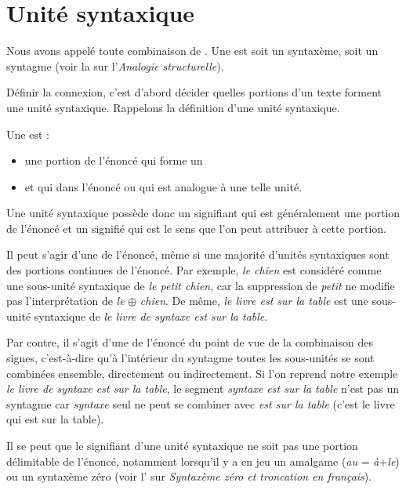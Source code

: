 \section{Unité syntaxique}\label{sec:3.2.9}

Nous avons appelé  toute combinaison de . Une  est soit un syntaxème, soit un syntagme (voir la  sur l'\textit{Analogie structurelle}).

Définir la connexion, c’est d’abord décider quelles portions d’un texte forment une unité syntaxique. Rappelons la définition d’une unité syntaxique.

{Une  est :

   \begin{itemize}
   \item une portion de l’énoncé qui forme un 
   \item et qui  dans l’énoncé ou qui est analogue à une telle unité.
   \end{itemize}
   }
   
Une unité syntaxique possède donc un signifiant qui est généralement une portion de l’énoncé et un signifié qui est le sens que l’on peut attribuer à cette portion.

Il peut s’agir d’une  de l’énoncé, même si une majorité d’unités syntaxiques sont des portions continues de l’énoncé. Par exemple, \textit{le chien} est considéré comme une sous-unité syntaxique de \textit{le petit chien}, car la suppression de \textit{petit} ne modifie pas l’interprétation de \textit{le} ${\oplus}$ \textit{chien}. De même, \textit{le livre est sur la table} est une sous-unité syntaxique de \textit{le livre de syntaxe est sur la table}.

Par contre, il s’agit d’une  de l’énoncé du point de vue de la combinaison des signes, c’est-à-dire qu’à l’intérieur du syntagme toutes les sous-unités se sont combinées ensemble, directement ou indirectement. Si l’on reprend notre exemple \textit{le livre de syntaxe est sur la table}, le segment \textit{syntaxe est sur la table} n’est pas un syntagme car \textit{syntaxe} seul ne peut se combiner avec \textit{est sur la table} (c’est le livre qui est sur la table).

Il se peut que le signifiant d’une unité syntaxique ne soit pas une portion délimitable de l’énoncé, notamment lorsqu’il y a en jeu un amalgame (\textit{au} = \textit{à}+\textit{le}) ou un syntaxème zéro (voir l’ sur \textit{Syntaxème zéro et troncation en français}).

